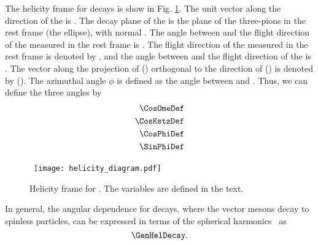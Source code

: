 The helicity frame for \BzToOmeKstz decays is show in Fig. \ref{helicity_diagram}. The unit vector along the direction of the \Ome is \bfv. The decay plane of the \Ome is the plane of the three-pions in the \Ome rest frame (the ellipse), with normal \pOne. The angle between \pOne and the flight direction of the \Ome measured in the \Ome rest frame is \ThetaOme. The flight direction of the \kp measured in the \Kstz rest frame is denoted by \pTwo, and the angle between \pTwo and the flight direction of the \Kstz is \ThetaKstz. The vector along the projection of \pOne (\pTwo) orthogonal to the direction of \Ome (\Kstz) is denoted by \bfc (\bfd). The azimuthal angle $\phi$ is defined as the angle between \bfc and \bfd. Thus, we can define the three angles by
\begin{eqnarray}
\CosOmeDef \nonumber \\
\CosKstzDef \nonumber \\
\CosPhiDef \nonumber \\
\SinPhiDef
\end{eqnarray}
\begin{figure}[t]
\centerline{
\hbox{
\texttt{[image: helicity\_diagram.pdf]}\hspace{0.2cm} }}
\caption{Helicity frame for \BzToOmeKstz. The variables are defined in the text. \label{helicity_diagram} }
\vskip -0.2cm
\end{figure}
In general, the angular dependence for \BvOvT decays, where the vector mesons decay to spinless particles, can be expressed in terms of the spherical harmonics~\cite{BBk} as
\begin{equation}\label{GenHelDecay}
\GenHelDecay.
\end{equation}
